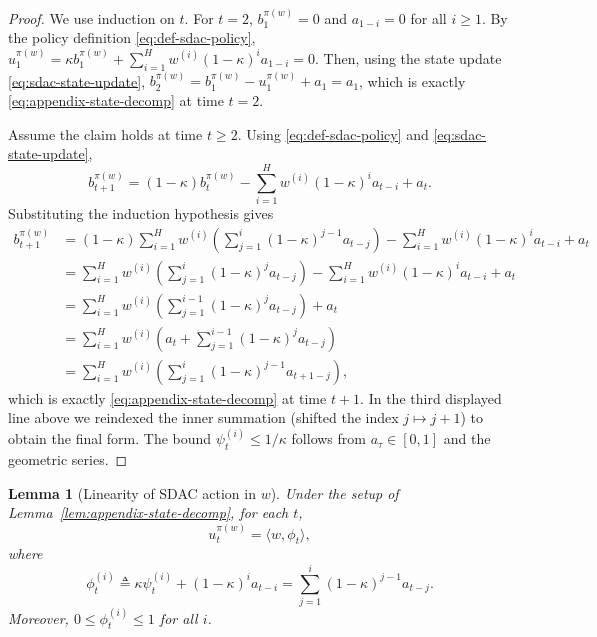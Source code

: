 \documentclass[11pt]{article}
\newtheorem{lemma}{Lemma}
\begin{document}
\begin{proof}
We use induction on $t$. For $t=2$, $b_1^{\pi(w)}=0$ and $a_{1-i}=0$ for all $i\ge 1$. By the policy definition \eqref{eq:def-sdac-policy},
\(u_1^{\pi(w)}=\kappa b_1^{\pi(w)}+\sum_{i=1}^H w^{(i)}(1-\kappa)^i a_{1-i}=0\). Then, using the state update \eqref{eq:sdac-state-update},
\(b_2^{\pi(w)}=b_1^{\pi(w)}-u_1^{\pi(w)}+a_1=a_1\), which is exactly \eqref{eq:appendix-state-decomp} at time $t=2$.

Assume the claim holds at time $t\ge 2$. Using \eqref{eq:def-sdac-policy} and \eqref{eq:sdac-state-update},
\[
b_{t+1}^{\pi(w)}
= (1-\kappa)b_t^{\pi(w)} - \sum_{i=1}^H w^{(i)}(1-\kappa)^i a_{t-i} + a_t.
\]
Substituting the induction hypothesis gives
\[
\begin{aligned}
b_{t+1}^{\pi(w)}
&= (1-\kappa)\sum_{i=1}^H w^{(i)}\!\left(\sum_{j=1}^{i}(1-\kappa)^{j-1}a_{t-j}\right)
    - \sum_{i=1}^H w^{(i)}(1-\kappa)^i a_{t-i} + a_t \\
&= \sum_{i=1}^H w^{(i)}\!\left(\sum_{j=1}^{i}(1-\kappa)^j a_{t-j}\right)
    - \sum_{i=1}^H w^{(i)}(1-\kappa)^i a_{t-i} + a_t \\
&= \sum_{i=1}^H w^{(i)}\!\left(\sum_{j=1}^{i-1}(1-\kappa)^j a_{t-j}\right) + a_t \\
&= \sum_{i=1}^H w^{(i)}\!\left(a_t + \sum_{j=1}^{i-1}(1-\kappa)^j a_{t-j}\right) \\
&= \sum_{i=1}^H w^{(i)}\!\left(\sum_{j=1}^{i}(1-\kappa)^{j-1}a_{t+1-j}\right),
\end{aligned}
\]
which is exactly \eqref{eq:appendix-state-decomp} at time $t+1$. In the third displayed line above we reindexed the inner summation (shifted the index $j\mapsto j+1$) to obtain the final form. The bound $\psi_t^{(i)}\le 1/\kappa$ follows from $a_\tau\in[0,1]$ and the geometric series.
\end{proof}

\begin{lemma}[Linearity of SDAC action in $w$]
\label{lem:appendix-action-linear}
Under the setup of Lemma~\ref{lem:appendix-state-decomp}, for each $t$,
\[
u_t^{\pi(w)} = \langle w,\phi_t\rangle,
\]
where
\[
\phi_t^{(i)} \triangleq \kappa\psi_t^{(i)} + (1-\kappa)^i a_{t-i}  = \sum_{j=1}^{i}(1-\kappa)^{j-1}a_{t-j}.
\]
Moreover, $0\le \phi_t^{(i)}\le 1$ for all $i$.
\end{lemma}
\end{document}
